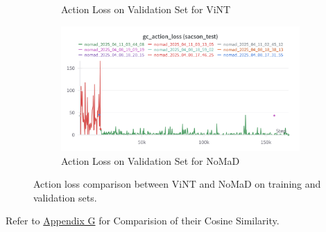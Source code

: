 \documentclass[12pt]{article}
\begin{document}
\begin{figure}[H]
\begin{subfigure}[b]{0.48\textwidth}
        \caption{Action Loss on Validation Set for ViNT}
        \label{fig:gc_action_loss_val_vint}
    \end{subfigure}
    \hfill
    \begin{subfigure}[b]{0.48\textwidth}
        \centering
        \includegraphics[width=\textwidth]{images/gc_actionloss_test_nomad.png}
        \caption{Action Loss on Validation Set for NoMaD}
        \label{fig:gc_action_loss_val_vint}
    \end{subfigure}
    \caption{Action loss comparison between ViNT and NoMaD on training and validation sets.}
\end{figure}
Refer to \hyperref[app:wandb]{Appendix G} for Comparision of their Cosine Similarity.\\
\end{document}
